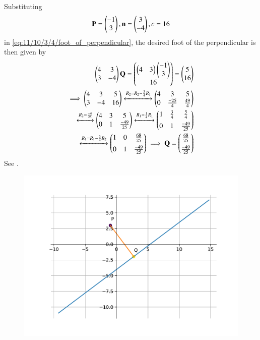 Substituting
\begin{align}
 \mathbf{P}=\begin{pmatrix}
-1\\
3
\end{pmatrix},
\mathbf{n}=\begin{pmatrix}
3\\
-4
\end{pmatrix}, c=16
\end{align}
in 
	\eqref{eq:11/10/3/4/foot_of_perpendicular},
the desired foot of the perpendicular is then given by 
\begin{align}
\begin{pmatrix}4&3\\3&-4\end{pmatrix}\mathbf{Q}=\begin{pmatrix}\begin{pmatrix}4&3\end{pmatrix}\begin{pmatrix}-1\\3\end{pmatrix}\\16\end{pmatrix}
=\begin{pmatrix}5\\16\end{pmatrix}  
\\
\implies
  \begin{pmatrix}
   4 &  3  & 5\\
   3 & -4  & 16\end{pmatrix} 
  \xleftrightarrow[]{R_2=R_2-\frac{3}{4}R_1}
  \begin{pmatrix}
  4 & 3 & 5\\
  0 & \frac{-25}{4} & \frac{49}{4}\end{pmatrix} 
\\
  \xleftrightarrow{R_2=\frac{-4}{25}}
  \begin{pmatrix}
  4 & 3 & 5\\
  0 & 1 & \frac{-49}{25}\end{pmatrix}
  \xleftrightarrow{R_1=\frac{1}{4}R_1}
  \begin{pmatrix}
  1 & \frac{3}{4} & \frac{5}{4}\\[1ex]
  0 & 1 & \frac{-49}{25}\end{pmatrix}
\\
  \xleftrightarrow{R_1=R_1-\frac{3}{4}R_2}
  \begin{pmatrix}
  1 & 0 & \frac{68}{25}\\[1ex]
  0 & 1 & \frac{-49}{25}\end{pmatrix}          
\implies \mathbf{Q}=\begin{pmatrix}
\frac{68}{25}\\[1ex]
\frac{-49}{25}
\end{pmatrix}
\end{align}
See 
.
\begin{figure}[H]
	\begin{center} 
	    \includegraphics[width=0.75\columnwidth]{chapters/11/10/3/14/figs/fig.pdf}
	\end{center}
\caption{}
\label{fig:chapters/11/10/3/14/Fig}
\end{figure}
